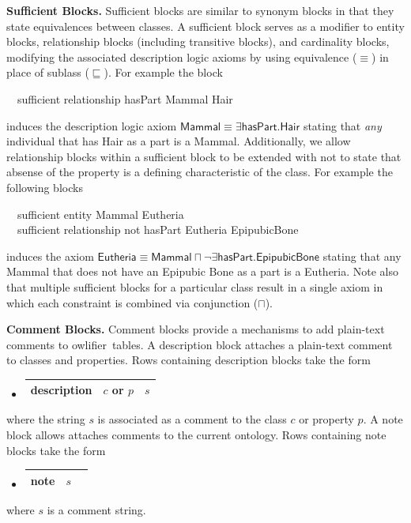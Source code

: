 \documentclass[preprint,number]{elsarticle}
\newcommand{\owlifier}{\textsf{owlifier}}
\newcommand{\myblock}[1]{\vspace{12pt}\noindent\textbf{#1}}
\begin{document}
\myblock{Sufficient Blocks.} Sufficient blocks are similar to synonym
blocks in that they state equivalences between classes. A sufficient
block serves as a modifier to entity blocks, relationship blocks
(including transitive blocks), and cardinality blocks, modifying the
associated description logic axioms by using equivalence ($\equiv$) in
place of sublass ($\sqsubseteq$). For example the block
\begin{tabbing}
  ~~\textsf{sufficient} \textsf{relationship} \textsf{hasPart} \textsf{Mammal} \textsf{Hair} 
\end{tabbing}
induces the description logic axiom $\textsf{Mammal} \equiv \exists
\textsf{hasPart}.\textsf{Hair}$ stating that \emph{any} individual
that has Hair as a part is a Mammal. Additionally, we allow
relationship blocks within a sufficient block to be extended with
\textsf{not} to state that absense of the property is a defining
characteristic of the class. For example the following blocks
\begin{tabbing}
  ~~\textsf{sufficient} \textsf{entity} \textsf{Mammal} \textsf{Eutheria} \\
  ~~\textsf{sufficient} \textsf{relationship not} \textsf{hasPart} \textsf{Eutheria} \textsf{EpipubicBone} 
\end{tabbing}
induces the axiom $\textsf{Eutheria} \equiv \textsf{Mammal} \sqcap
\neg \exists \textsf{hasPart} . \textsf{EpipubicBone}$ stating that
any Mammal that does not have an Epipubic Bone as a part is a
Eutheria. Note also that multiple sufficient blocks for a particular
class result in a single axiom in which each constraint is combined
via conjunction ($\sqcap$).


\myblock{Comment Blocks.} Comment blocks provide a mechanisms to add
plain-text comments to \owlifier\ tables. A description block attaches
a plain-text comment to classes and properties. Rows containing
description blocks take the form
\begin{itemize}
\item[]
  \begin{tabular}{|l|l|l|}\hline \textsf{description} & $c$ or $p$ & $s$
    \\ \hline
  \end{tabular}
\end{itemize}
where the string $s$ is associated as a comment to the class $c$ or
property $p$. A note block allows attaches comments to the current
ontology. Rows containing note blocks take the form
\begin{itemize}
\item[]
  \begin{tabular}{|l|l|l|}\hline \textsf{note} & $s$
\\ \hline
  \end{tabular}
\end{itemize}
where $s$ is a comment string.
\end{document}
